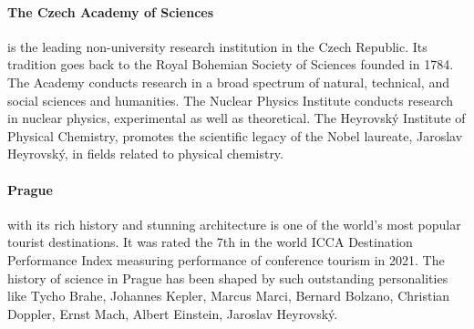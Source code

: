 \documentclass[12pt]{extarticle}
\begin{document}
\paragraph{The Czech Academy of Sciences} is the leading
non-university research institution in the Czech Republic. Its
tradition goes back to the Royal Bohemian Society of Sciences founded
in 1784. The Academy conducts research in a broad spectrum of natural,
technical, and social sciences and humanities. The Nuclear Physics
Institute conducts research in nuclear physics, experimental as well
as theoretical. The Heyrovský Institute of Physical Chemistry,
promotes the scientific legacy of the Nobel laureate, Jaroslav
Heyrovský, in fields related to physical chemistry.

\paragraph{Prague} with its rich history and stunning architecture is
one of the world's most popular tourist destinations. It was rated the
7th in the world ICCA Destination Performance Index measuring
performance of conference tourism in 2021. The history of science in
Prague has been shaped by such outstanding personalities like Tycho
Brahe, Johannes Kepler, Marcus Marci, Bernard Bolzano, Christian
Doppler, Ernst Mach, Albert Einstein, Jaroslav Heyrovský.
\end{document}
